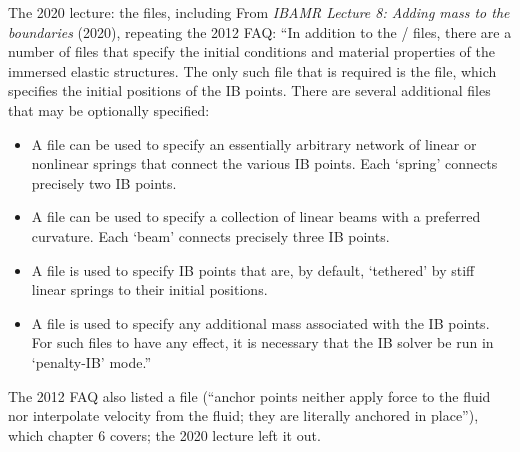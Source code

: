 \documentclass[aspectratio=169,11pt]{beamer}
\begin{document}
\begin{frame}{The 2020 lecture: the files, including }
\label{fr:files}
\small From \emph{IBAMR Lecture 8: Adding mass to the boundaries} (2020), repeating the 2012 FAQ: ``In addition to the / files, there are a number of files that specify the initial conditions and material properties of the immersed elastic structures. The only such file that is required is the  file, which specifies the initial positions of the IB points. There are several additional files that may be optionally specified:
\begin{itemize}
  \item A  file can be used to specify an essentially arbitrary network of linear or nonlinear springs that connect the various IB points. Each `spring' connects precisely two IB points.
  \item A  file can be used to specify a collection of linear beams with a preferred curvature. Each `beam' connects precisely three IB points.
  \item A  file is used to specify IB points that are, by default, `tethered' by stiff linear springs to their initial positions.
  \item A  file is used to specify any additional mass associated with the IB points. For such files to have any effect, it is necessary that the IB solver be run in `penalty-IB' mode.''
\end{itemize}
\vspace{1mm}
\footnotesize The 2012 FAQ also listed a  file (``anchor points neither apply force to the fluid nor interpolate velocity from the fluid; they are literally anchored in place''), which chapter 6 covers; the 2020 lecture left it out.
\end{frame}
\end{document}
